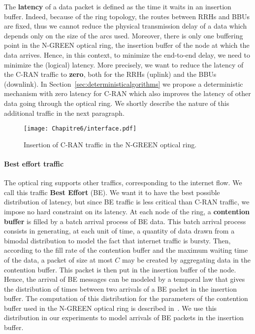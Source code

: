    The {\bf latency} of a data packet is defined as the time it waits in an insertion buffer.
   Indeed, because of the ring topology, the routes between RRHs and BBUs are fixed, thus we cannot reduce the physical transmission delay of a data which depends only on the size of the arcs used. Moreover, there is only one buffering point in the N-GREEN optical ring, the insertion buffer of the node at which the data arrives. Hence, in this context, to minimize the end-to-end delay, we need to minimize the (logical) latency.
   More precisely, we want to reduce the latency of the C-RAN traffic to \textbf{zero}, both for the RRHs (uplink) and the BBUs (downlink). In Section~\ref{sec:deterministicalgorithms} we propose a deterministic mechanism with zero latency for C-RAN which also improves the latency of other data going through the optical ring. We shortly describe the nature of this additional traffic in the next paragraph.
    
\begin{figure}[h!]
\begin{center}  
      \texttt{[image: Chapitre6/interface.pdf]}
     \caption{Insertion of C-RAN traffic in the N-GREEN optical ring.}\label{fig:interface}
\end{center}
  \end{figure}
\vspace{-0.5cm}
\paragraph{Best effort traffic}

The optical ring supports other traffics, corresponding to the internet flow. We call this traffic \textbf{Best Effort} (BE). We want it to have the best possible distribution of latency, but since BE traffic is less critical than C-RAN traffic, we impose no hard constraint on its latency. At each node of the ring, a {\bf contention buffer} is filled by a batch arrival process of BE data. 
This batch arrival process consists in generating, at each unit of time, a quantity of data drawn from a bimodal distribution to model the fact that internet traffic is bursty. Then, according to the fill rate of the contention buffer and the maximum waiting time of the data, a packet of size at most $C$ may be created by aggregating data in the contention buffer. This packet is then put in the insertion buffer of the node. Hence, the arrival of BE messages can be modeled by a temporal law that gives the distribution of times between two arrivals of a BE packet in the insertion buffer. The computation of this distribution for the parameters of the contention buffer used in the N-GREEN optical ring is described in~\cite{Cast1810:Performance}. We use this distribution in our experiments to model arrivals of BE packets in the insertion buffer.

